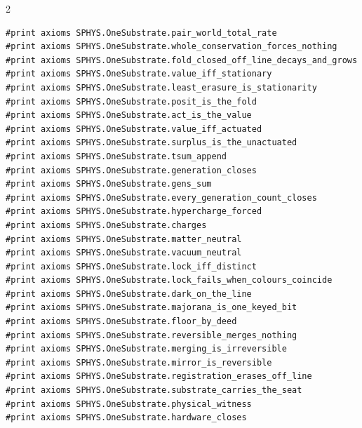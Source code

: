 \documentclass[10pt]{article}
\begin{document}
\begin{multicols}{2}
\begin{Verbatim}[fontsize=\fontsize{6.2}{7.2}\selectfont,breaklines,breakanywhere,breaksymbolleft={}]
#print axioms SPHYS.OneSubstrate.pair_world_total_rate
#print axioms SPHYS.OneSubstrate.whole_conservation_forces_nothing
#print axioms SPHYS.OneSubstrate.fold_closed_off_line_decays_and_grows
#print axioms SPHYS.OneSubstrate.value_iff_stationary
#print axioms SPHYS.OneSubstrate.least_erasure_is_stationarity
#print axioms SPHYS.OneSubstrate.posit_is_the_fold
#print axioms SPHYS.OneSubstrate.act_is_the_value
#print axioms SPHYS.OneSubstrate.value_iff_actuated
#print axioms SPHYS.OneSubstrate.surplus_is_the_unactuated
#print axioms SPHYS.OneSubstrate.tsum_append
#print axioms SPHYS.OneSubstrate.generation_closes
#print axioms SPHYS.OneSubstrate.gens_sum
#print axioms SPHYS.OneSubstrate.every_generation_count_closes
#print axioms SPHYS.OneSubstrate.hypercharge_forced
#print axioms SPHYS.OneSubstrate.charges
#print axioms SPHYS.OneSubstrate.matter_neutral
#print axioms SPHYS.OneSubstrate.vacuum_neutral
#print axioms SPHYS.OneSubstrate.lock_iff_distinct
#print axioms SPHYS.OneSubstrate.lock_fails_when_colours_coincide
#print axioms SPHYS.OneSubstrate.dark_on_the_line
#print axioms SPHYS.OneSubstrate.majorana_is_one_keyed_bit
#print axioms SPHYS.OneSubstrate.floor_by_deed
#print axioms SPHYS.OneSubstrate.reversible_merges_nothing
#print axioms SPHYS.OneSubstrate.merging_is_irreversible
#print axioms SPHYS.OneSubstrate.mirror_is_reversible
#print axioms SPHYS.OneSubstrate.registration_erases_off_line
#print axioms SPHYS.OneSubstrate.substrate_carries_the_seat
#print axioms SPHYS.OneSubstrate.physical_witness
#print axioms SPHYS.OneSubstrate.hardware_closes
\end{Verbatim}
\end{multicols}
\end{document}
